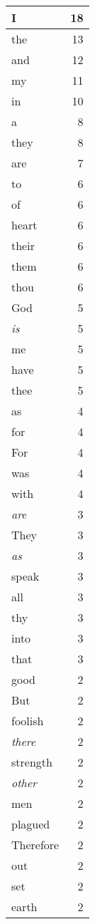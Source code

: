 \begin{center}
\begin{longtable}{l|r}
\hline \hline
\endlastfoot
I & 18 \\ \hline
the & 13 \\ \hline
and & 12 \\ \hline
my & 11 \\ \hline
in & 10 \\ \hline
a & 8 \\ \hline
they & 8 \\ \hline
are & 7 \\ \hline
to & 6 \\ \hline
of & 6 \\ \hline
heart & 6 \\ \hline
their & 6 \\ \hline
them & 6 \\ \hline
thou & 6 \\ \hline
God & 5 \\ \hline
\emph{is} & 5 \\ \hline
me & 5 \\ \hline
have & 5 \\ \hline
thee & 5 \\ \hline
as & 4 \\ \hline
for & 4 \\ \hline
For & 4 \\ \hline
was & 4 \\ \hline
with & 4 \\ \hline
\emph{are} & 3 \\ \hline
They & 3 \\ \hline
\emph{as} & 3 \\ \hline
speak & 3 \\ \hline
all & 3 \\ \hline
thy & 3 \\ \hline
into & 3 \\ \hline
that & 3 \\ \hline
good & 2 \\ \hline
But & 2 \\ \hline
foolish & 2 \\ \hline
\emph{there} & 2 \\ \hline
strength & 2 \\ \hline
\emph{other} & 2 \\ \hline
men & 2 \\ \hline
plagued & 2 \\ \hline
Therefore & 2 \\ \hline
out & 2 \\ \hline
set & 2 \\ \hline
earth & 2 \\ \hline

\end{longtable}
\end{center}

